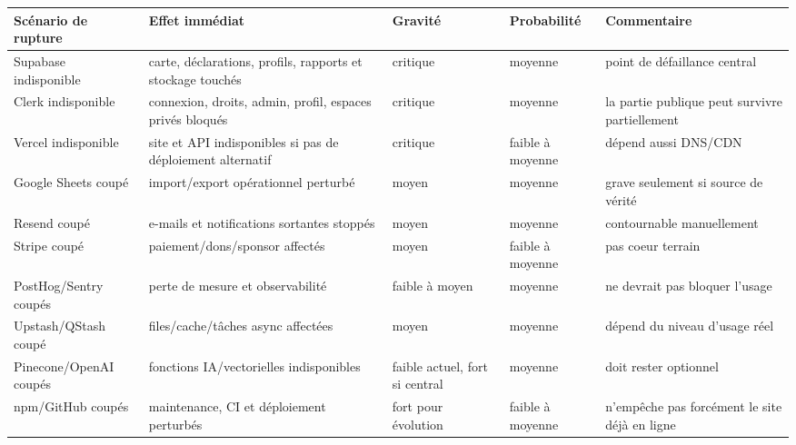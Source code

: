 \documentclass[
  10pt,
  a4paper,
  DIV=11,
  numbers=noendperiod,
  oneside]{scrreprt}
\newcounter{none} %
\begin{document}
{\def\LTcaptype{none} %
\begin{longtable}[]{@{}
  >{\raggedright\arraybackslash}p{}
  >{\raggedright\arraybackslash}p{}
  >{\raggedleft\arraybackslash}p{}
  >{\raggedleft\arraybackslash}p{}
  >{\raggedright\arraybackslash}p{}@{}}
\toprule\noalign{}
\begin{minipage}[b]{\linewidth}\raggedright
Scénario de rupture
\end{minipage} & \begin{minipage}[b]{\linewidth}\raggedright
Effet immédiat
\end{minipage} & \begin{minipage}[b]{\linewidth}\raggedleft
Gravité
\end{minipage} & \begin{minipage}[b]{\linewidth}\raggedleft
Probabilité
\end{minipage} & \begin{minipage}[b]{\linewidth}\raggedright
Commentaire
\end{minipage} \\
\midrule\noalign{}
\endhead
\bottomrule\noalign{}
\endlastfoot
Supabase indisponible & carte, déclarations, profils, rapports et
stockage touchés & critique & moyenne & point de défaillance central \\
Clerk indisponible & connexion, droits, admin, profil, espaces privés
bloqués & critique & moyenne & la partie publique peut survivre
partiellement \\
Vercel indisponible & site et API indisponibles si pas de déploiement
alternatif & critique & faible à moyenne & dépend aussi DNS/CDN \\
Google Sheets coupé & import/export opérationnel perturbé & moyen &
moyenne & grave seulement si source de vérité \\
Resend coupé & e-mails et notifications sortantes stoppés & moyen &
moyenne & contournable manuellement \\
Stripe coupé & paiement/dons/sponsor affectés & moyen & faible à moyenne
& pas coeur terrain \\
PostHog/Sentry coupés & perte de mesure et observabilité & faible à
moyen & moyenne & ne devrait pas bloquer l'usage \\
Upstash/QStash coupé & files/cache/tâches async affectées & moyen &
moyenne & dépend du niveau d'usage réel \\
Pinecone/OpenAI coupés & fonctions IA/vectorielles indisponibles &
faible actuel, fort si central & moyenne & doit rester optionnel \\
npm/GitHub coupés & maintenance, CI et déploiement perturbés & fort pour
évolution & faible à moyenne & n'empêche pas forcément le site déjà en
ligne \\
\end{longtable}
}
\end{document}
